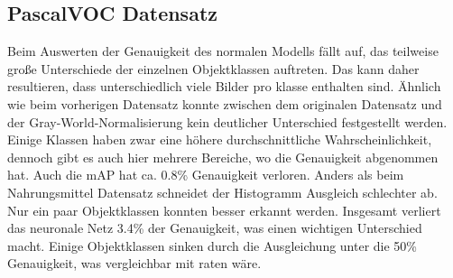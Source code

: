 \documentclass[a4paper,12pt,oneside]{article}
\begin{document}
  \subsection{PascalVOC Datensatz}
Beim Auswerten der Genauigkeit des normalen Modells fällt auf, das teilweise große Unterschiede der einzelnen Objektklassen auftreten. Das kann daher resultieren, dass unterschiedlich viele Bilder pro klasse enthalten sind. Ähnlich wie beim vorherigen Datensatz konnte zwischen dem originalen Datensatz und der Gray-World-Normalisierung kein deutlicher Unterschied festgestellt werden. Einige Klassen haben zwar eine höhere durchschnittliche Wahrscheinlichkeit, dennoch gibt es auch hier mehrere Bereiche, wo die Genauigkeit abgenommen hat. Auch die mAP hat ca. 0.8\% Genauigkeit verloren. Anders als beim Nahrungsmittel Datensatz schneidet der Histogramm Ausgleich schlechter ab. Nur ein paar Objektklassen konnten besser erkannt werden. Insgesamt verliert das neuronale Netz 3.4\% der Genauigkeit, was einen wichtigen Unterschied macht. Einige Objektklassen sinken durch die Ausgleichung unter die 50\% Genauigkeit, was vergleichbar mit raten wäre.
\end{document}
